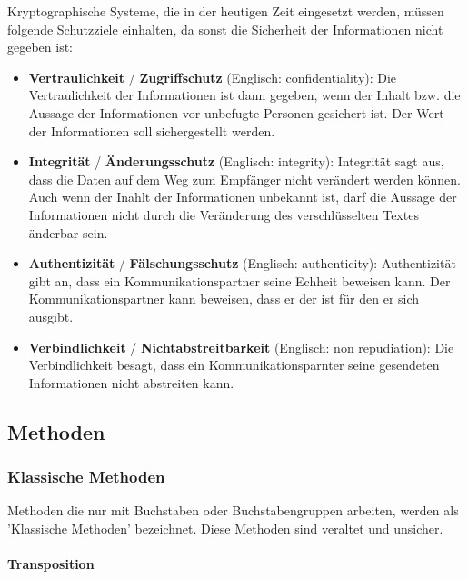 \documentclass[12pt,a4paper]{report}
\begin{document}
\begin{onehalfspace}
Kryptographische Systeme, die in der heutigen Zeit eingesetzt werden, müssen folgende Schutzziele einhalten, da sonst die Sicherheit der Informationen nicht gegeben ist: \cite{wiki02}

\begin{itemize}

\item \textbf{Vertraulichkeit} / \textbf{Zugriffschutz} (Englisch: confidentiality): Die Vertraulichkeit der Informationen ist dann gegeben, wenn der Inhalt bzw. die Aussage der Informationen vor unbefugte Personen gesichert ist. Der Wert der Informationen soll sichergestellt werden.

\item \textbf{Integrität} / \textbf{Änderungsschutz}  (Englisch: integrity): Integrität sagt aus, dass die Daten auf dem Weg zum Empfänger nicht verändert werden können. Auch wenn der Inahlt der Informationen unbekannt ist, darf die Aussage der Informationen nicht durch die Veränderung des verschlüsselten Textes änderbar sein.

\item \textbf{Authentizität} / \textbf{Fälschungsschutz} (Englisch: authenticity): Authentizität gibt an, dass ein Kommunikationspartner seine Echheit beweisen kann. Der Kommunikationspartner kann beweisen, dass er der ist für den er sich ausgibt.

\item \textbf{Verbindlichkeit} / \textbf{Nichtabstreitbarkeit} (Englisch: non repudiation): Die Verbindlichkeit besagt, dass ein Kommunikationsparnter seine gesendeten Informationen nicht abstreiten kann.
\end{itemize}

\subsection{Methoden}

\subsubsection{Klassische Methoden}

Methoden die nur mit Buchstaben oder Buchstabengruppen arbeiten, werden als 'Klassische Methoden' bezeichnet. Diese Methoden sind veraltet und unsicher.

\paragraph{Transposition}


\end{onehalfspace}
\end{document}
